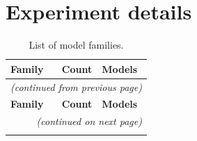 

\section{Experiment details}

\begin{longtable}
{@{}lrp{11cm}@{}}
\caption{List of model families.}
\label{tab:model-families} \\
\toprule
\textbf{Family} & \textbf{Count} & \textbf{Models} \\
\midrule
\endfirsthead

\multicolumn{3}{c}{\textit{(continued from previous page)}} \\
\toprule
\textbf{Family} & \textbf{Count} & \textbf{Models} \\
\midrule
\endhead

\midrule
\multicolumn{3}{r}{\textit{(continued on next page)}} \\
\endfoot

\bottomrule
\endlastfoot


\end{longtable}
